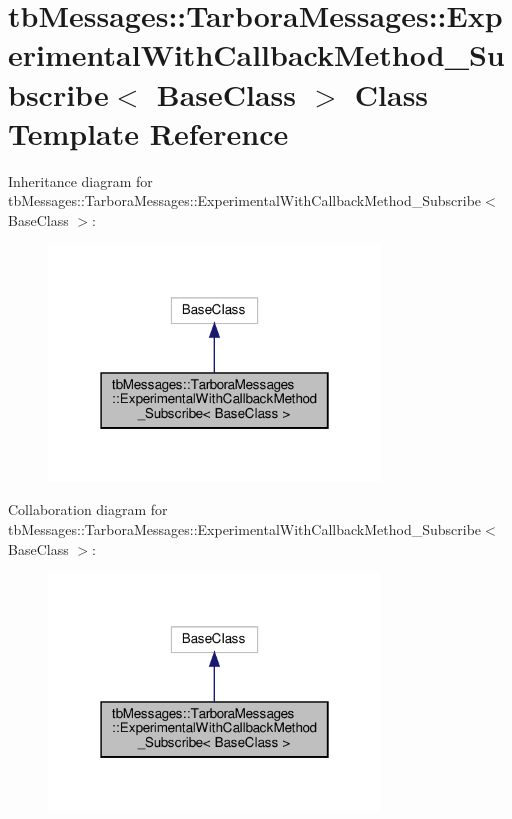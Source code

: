 \hypertarget{classtbMessages_1_1TarboraMessages_1_1ExperimentalWithCallbackMethod__Subscribe}{}\section{tb\+Messages\+:\+:Tarbora\+Messages\+:\+:Experimental\+With\+Callback\+Method\+\_\+\+Subscribe$<$ Base\+Class $>$ Class Template Reference}
\label{classtbMessages_1_1TarboraMessages_1_1ExperimentalWithCallbackMethod__Subscribe}


Inheritance diagram for tb\+Messages\+:\+:Tarbora\+Messages\+:\+:Experimental\+With\+Callback\+Method\+\_\+\+Subscribe$<$ Base\+Class $>$\+:
\nopagebreak
\begin{figure}[H]
\begin{center}
\leavevmode
\includegraphics[width=250pt]{classtbMessages_1_1TarboraMessages_1_1ExperimentalWithCallbackMethod__Subscribe__inherit__graph}
\end{center}
\end{figure}


Collaboration diagram for tb\+Messages\+:\+:Tarbora\+Messages\+:\+:Experimental\+With\+Callback\+Method\+\_\+\+Subscribe$<$ Base\+Class $>$\+:
\nopagebreak
\begin{figure}[H]
\begin{center}
\leavevmode
\includegraphics[width=250pt]{classtbMessages_1_1TarboraMessages_1_1ExperimentalWithCallbackMethod__Subscribe__coll__graph}
\end{center}
\end{figure}
